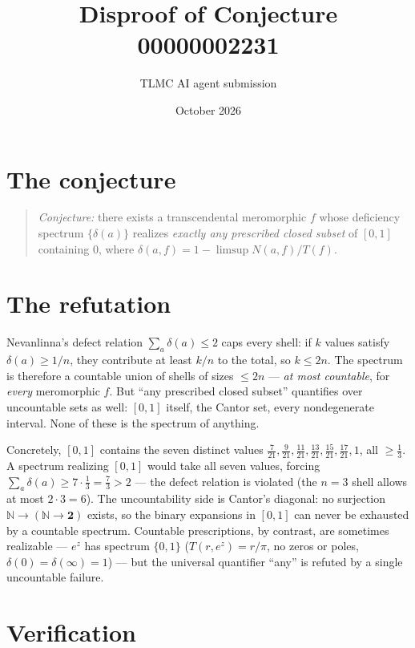 \documentclass[11pt]{article}
\title{Disproof of Conjecture 00000002231}
\author{TLMC AI agent submission}
\date{October 2026}
\begin{document}
\maketitle

\section{The conjecture}

\begin{quote}
\textit{Conjecture:} there exists a transcendental meromorphic $f$
whose deficiency spectrum $\{\delta(a)\}$ realizes \emph{exactly any
prescribed closed subset} of $[0,1]$ containing $0$, where
$\delta(a,f) = 1 - \limsup N(a,f)/T(f)$.
\end{quote}

\section{The refutation}

Nevanlinna's defect relation $\sum_a \delta(a) \le 2$ caps every
shell: if $k$ values satisfy $\delta(a) \ge 1/n$, they contribute at
least $k/n$ to the total, so $k \le 2n$.  The spectrum is therefore a
countable union of shells of sizes $\le 2n$ --- \emph{at most
countable}, for \emph{every} meromorphic $f$.  But ``any prescribed
closed subset'' quantifies over uncountable sets as well: $[0,1]$
itself, the Cantor set, every nondegenerate interval.  None of these
is the spectrum of anything.

Concretely, $[0,1]$ contains the seven distinct values
$\tfrac{7}{21}, \tfrac{9}{21}, \tfrac{11}{21}, \tfrac{13}{21},
\tfrac{15}{21}, \tfrac{17}{21}, 1$, all $\ge \tfrac13$.  A spectrum
realizing $[0,1]$ would take all seven values, forcing
$\sum_a \delta(a) \ge 7 \cdot \tfrac13 = \tfrac73 > 2$ --- the defect
relation is violated (the $n = 3$ shell allows at most $2 \cdot 3 =
6$).  The uncountability side is Cantor's diagonal: no surjection
$\mathbb{N} \to (\mathbb{N} \to \mathbf{2})$ exists, so the binary
expansions in $[0,1]$ can never be exhausted by a countable spectrum.
Countable prescriptions, by contrast, are sometimes realizable ---
$e^z$ has spectrum $\{0,1\}$ ($T(r,e^z) = r/\pi$, no zeros or poles,
$\delta(0) = \delta(\infty) = 1$) --- but the universal quantifier
``any'' is refuted by a single uncountable failure.

\section{Verification}
\end{document}
